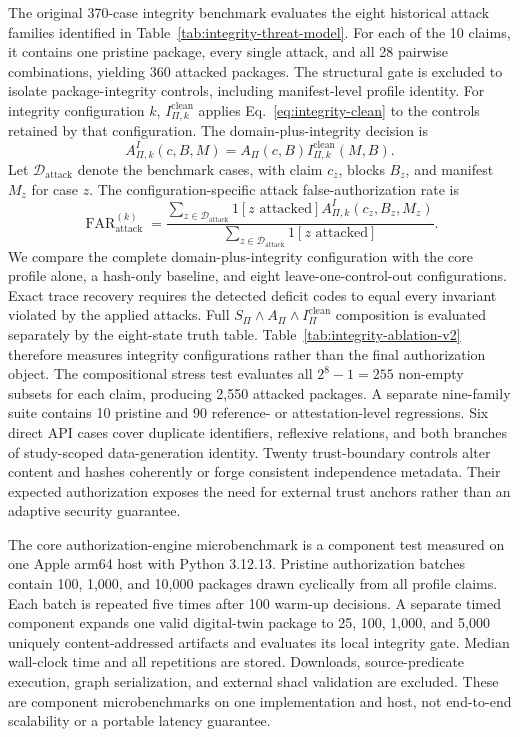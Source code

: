 The original 370-case integrity benchmark evaluates the eight historical attack families identified in Table~\ref{tab:integrity-threat-model}. For each of the 10 claims, it contains one pristine package, every single attack, and all 28 pairwise combinations, yielding 360 attacked packages. The structural gate is excluded to isolate package-integrity controls, including manifest-level profile identity. For integrity configuration $k$, $I^{\mathrm{clean}}_{\Pi,k}$ applies Eq.~\ref{eq:integrity-clean} to the controls retained by that configuration. The domain-plus-integrity decision is
\begin{equation}
A^{I}_{\Pi,k}(c,B,M)=A_{\Pi}(c,B)
I^{\mathrm{clean}}_{\Pi,k}(M,B).
\label{eq:integrity-ablation-decision}
\end{equation}
Let $\mathcal{D}_{\mathrm{attack}}$ denote the benchmark cases, with claim $c_z$, blocks $B_z$, and manifest $M_z$ for case $z$. The configuration-specific attack false-authorization rate is
\begin{equation}
\operatorname{FAR}^{(k)}_{\mathrm{attack}}=
\frac{\sum_{z\in\mathcal{D}_{\mathrm{attack}}}\mathrm{1}[z\text{ attacked}]
A^{I}_{\Pi,k}(c_z,B_z,M_z)}
{\sum_{z\in\mathcal{D}_{\mathrm{attack}}}\mathrm{1}[z\text{ attacked}]}.
\label{eq:attack-far}
\end{equation}
We compare the complete domain-plus-integrity configuration with the core profile alone, a hash-only baseline, and eight leave-one-control-out configurations. Exact trace recovery requires the detected deficit codes to equal every invariant violated by the applied attacks. Full $S_{\Pi}\land A_{\Pi}\land I^{\mathrm{clean}}_{\Pi}$ composition is evaluated separately by the eight-state truth table. Table~\ref{tab:integrity-ablation-v2} therefore measures integrity configurations rather than the final authorization object. The compositional stress test evaluates all $2^8-1=255$ non-empty subsets for each claim, producing 2,550 attacked packages. A separate nine-family suite contains 10 pristine and 90 reference- or attestation-level regressions. Six direct API cases cover duplicate identifiers, reflexive relations, and both branches of study-scoped data-generation identity. Twenty trust-boundary controls alter content and hashes coherently or forge consistent independence metadata. Their expected authorization exposes the need for external trust anchors rather than an adaptive security guarantee.

The core authorization-engine microbenchmark is a component test measured on one Apple arm64 host with Python 3.12.13. Pristine authorization batches contain 100, 1,000, and 10,000 packages drawn cyclically from all profile claims. Each batch is repeated five times after 100 warm-up decisions. A separate timed component expands one valid digital-twin package to 25, 100, 1,000, and 5,000 uniquely content-addressed artifacts and evaluates its local integrity gate. Median wall-clock time and all repetitions are stored. Downloads, source-predicate execution, graph serialization, and external \ac{shacl} validation are excluded. These are component microbenchmarks on one implementation and host, not end-to-end scalability or a portable latency guarantee.


